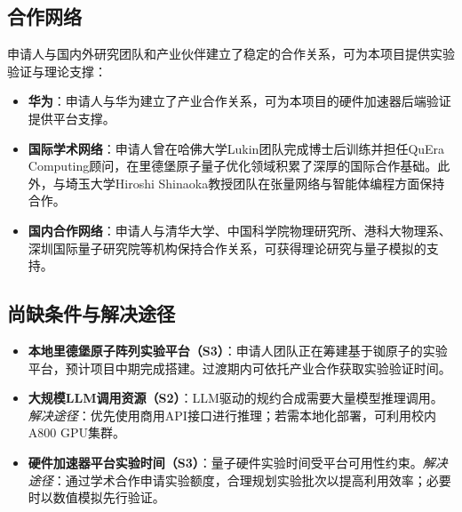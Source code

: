 \subsection*{合作网络}

申请人与国内外研究团队和产业伙伴建立了稳定的合作关系，可为本项目提供实验验证与理论支撑：

\begin{itemize}[leftmargin=2em, topsep=0pt, itemsep=2pt]
\item \textbf{华为}：申请人与华为建立了产业合作关系，可为本项目的硬件加速器后端验证提供平台支撑。

\item \textbf{国际学术网络}：申请人曾在哈佛大学Lukin团队完成博士后训练并担任QuEra Computing顾问，在里德堡原子量子优化领域积累了深厚的国际合作基础。此外，与埼玉大学Hiroshi Shinaoka教授团队在张量网络与智能体编程方面保持合作。

\item \textbf{国内合作网络}：申请人与清华大学、中国科学院物理研究所、港科大物理系、深圳国际量子研究院等机构保持合作关系，可获得理论研究与量子模拟的支持。
\end{itemize}

\subsection*{尚缺条件与解决途径}

\begin{itemize}[leftmargin=2em, topsep=0pt, itemsep=2pt]
\item \textbf{本地里德堡原子阵列实验平台（S3）}：申请人团队正在筹建基于铷原子的实验平台，预计项目中期完成搭建。过渡期内可依托产业合作获取实验验证时间。
\item \textbf{大规模LLM调用资源（S2）}：LLM驱动的规约合成需要大量模型推理调用。\textit{解决途径}：优先使用商用API接口进行推理；若需本地化部署，可利用校内A800 GPU集群。
\item \textbf{硬件加速器平台实验时间（S3）}：量子硬件实验时间受平台可用性约束。\textit{解决途径}：通过学术合作申请实验额度，合理规划实验批次以提高利用效率；必要时以数值模拟先行验证。
\end{itemize}

